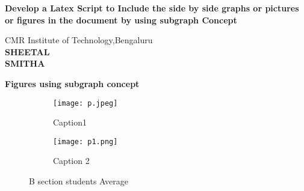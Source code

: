 \documentclass{article}
\begin{document}
\begin{center}
    \Large
    \textbf{Develop a Latex Script to Include the side by side graphs or pictures or figures in the document by using subgraph Concept}
    
    \vspace{0.4cm}
    \large
    CMR Institute of Technology,Bengaluru\\
    
    \vspace{0.4cm}
    \textbf{SHEETAL \\ SMITHA}
    
    \vspace{0.9cm}
    \textbf{Figures using subgraph concept}
\end{center}

\begin{figure}[h]

\begin{subfigure}{0.6\textwidth}
\texttt{[image: p.jpeg]}
\caption{Caption1}
\label{fig:subim1}
\end{subfigure}
\begin{subfigure}{0.6\textwidth}
\texttt{[image: p1.png]}
\caption{Caption 2}
\label{fig:subim2}

\end{subfigure}

\caption{B section students Average }
\label{fig:image2}
\end{figure}
\end{document}
